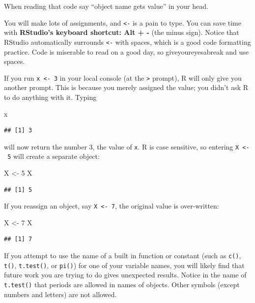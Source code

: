 \documentclass[
]{book}
\newenvironment{Shaded}{\begin{snugshade}}{\end{snugshade}}
\newcommand{\DecValTok}[1]{\textcolor[rgb]{0.00,0.00,0.81}{#1}}
\newcommand{\NormalTok}[1]{#1}
\newcommand{\OtherTok}[1]{\textcolor[rgb]{0.56,0.35,0.01}{#1}}
\begin{document}
When reading that code say ``object name gets value'' in your head.

You will make lots of assignments, and \texttt{\textless{}-} is a pain to type. You can save time with \textbf{RStudio's keyboard shortcut: Alt + -} (the minus sign). Notice that RStudio automatically surrounds \texttt{\textless{}-} with spaces, which is a good code formatting practice. Code is miserable to read on a good day, so giveyoureyesabreak and use spaces.

If you run \texttt{x\ \textless{}-\ 3} in your local console (at the \texttt{\textgreater{}} prompt), R will only give you another prompt. This is because you merely assigned the value; you didn't ask R to do anything with it. Typing

\begin{Shaded}
\begin{Highlighting}[]
\NormalTok{x}
\end{Highlighting}
\end{Shaded}

\begin{verbatim}
## [1] 3
\end{verbatim}

will now return the number 3, the value of \texttt{x}. R is case sensitive, so entering \texttt{X\ \textless{}-\ 5} will create a separate object:

\begin{Shaded}
\begin{Highlighting}[]
\NormalTok{X }\OtherTok{\textless{}{-}} \DecValTok{5}
\NormalTok{X}
\end{Highlighting}
\end{Shaded}

\begin{verbatim}
## [1] 5
\end{verbatim}

If you reassign an object, say \texttt{X\ \textless{}-\ 7}, the original value is over-written:

\begin{Shaded}
\begin{Highlighting}[]
\NormalTok{X }\OtherTok{\textless{}{-}} \DecValTok{7}
\NormalTok{X}
\end{Highlighting}
\end{Shaded}

\begin{verbatim}
## [1] 7
\end{verbatim}

If you attempt to use the name of a built in function or constant (such as \texttt{c()}, \texttt{t()}, \texttt{t.test()}, or \texttt{pi()}) for one of your variable names, you will likely find that future work you are trying to do gives unexpected results. Notice in the name of \texttt{t.test()} that periods are allowed in names of objects. Other symbols (except numbers and letters) are not allowed.
\end{document}
